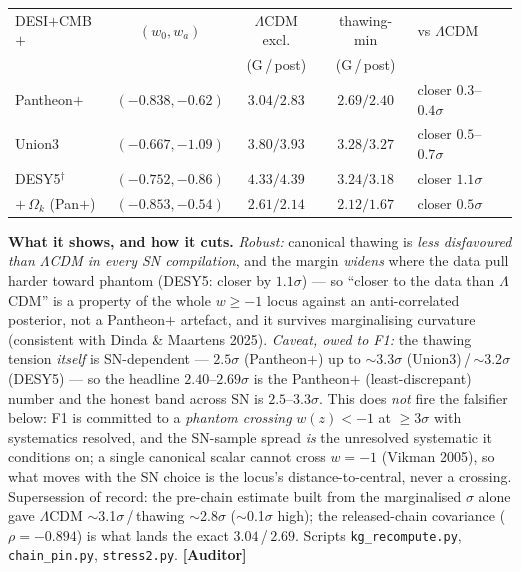 \documentclass[11pt]{article}
\newcommand{\Auditor}{\textbf{\textcolor{teal!55!black}{[Auditor]}}}
\begin{document}
\begin{center}\small
\begin{tabular}{lcccl}\toprule
DESI$+$CMB$+$ & $(w_0,w_a)$ & $\Lambda$CDM excl. & thawing-min & vs $\Lambda$CDM\\
 & & (G\,/\,post) & (G\,/\,post) & \\\midrule
Pantheon$+$ & $(-0.838,-0.62)$ & $3.04/2.83$ & $2.69/2.40$ & closer $0.3$--$0.4\sigma$\\
Union3 & $(-0.667,-1.09)$ & $3.80/3.93$ & $3.28/3.27$ & closer $0.5$--$0.7\sigma$\\
DESY5$^\dagger$ & $(-0.752,-0.86)$ & $4.33/4.39$ & $3.24/3.18$ & closer $1.1\sigma$\\
$+\,\Omega_k$ (Pan$+$) & $(-0.853,-0.54)$ & $2.61/2.14$ & $2.12/1.67$ & closer $0.5\sigma$\\\bottomrule
\end{tabular}\end{center}

\textbf{What it shows, and how it cuts.} \emph{Robust:} canonical thawing is \emph{less disfavoured than $\Lambda$CDM in every SN compilation}, and the margin \emph{widens} where the data pull harder toward phantom (DESY5: closer by $1.1\sigma$) --- so ``closer to the data than $\Lambda$CDM'' is a property of the whole $w\ge-1$ locus against an anti-correlated posterior, not a Pantheon$+$ artefact, and it survives marginalising curvature (consistent with Dinda \& Maartens 2025). \emph{Caveat, owed to F1:} the thawing tension \emph{itself} is SN-dependent --- $2.5\sigma$ (Pantheon$+$) up to $\sim$3.3$\sigma$ (Union3)\,/\,$\sim$3.2$\sigma$ (DESY5) --- so the headline $2.40$--$2.69\sigma$ is the Pantheon$+$ (least-discrepant) number and the honest band across SN is $2.5$--$3.3\sigma$. This does \emph{not} fire the falsifier below: F1 is committed to a \emph{phantom crossing} $w(z)<-1$ at $\ge3\sigma$ with systematics resolved, and the SN-sample spread \emph{is} the unresolved systematic it conditions on; a single canonical scalar cannot cross $w=-1$ (Vikman 2005), so what moves with the SN choice is the locus's distance-to-central, never a crossing. Supersession of record: the pre-chain estimate built from the marginalised $\sigma$ alone gave $\Lambda$CDM $\sim$3.1$\sigma$\,/\,thawing $\sim$2.8$\sigma$ ($\sim$0.1$\sigma$ high); the released-chain covariance ($\rho=-0.894$) is what lands the exact $3.04$\,/\,$2.69$. Scripts \texttt{kg\_recompute.py}, \texttt{chain\_pin.py}, \texttt{stress2.py}. \Auditor
\end{document}
